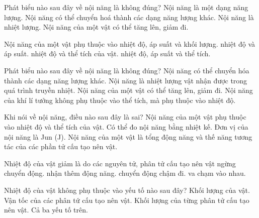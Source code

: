 \begin{ex}
Phát biểu nào sau đây về nội năng là không đúng?
\choice
{Nội năng là một dạng năng lượng.}
{Nội năng có thể chuyển hoá thành các dạng năng lượng khác.}
{\True Nội năng là nhiệt lượng.}
{Nội năng của một vật có thể tăng lên, giảm đi.}
\end{ex}

\begin{ex}
Nội năng của một vật phụ thuộc vào
\choice
{nhiệt độ, áp suất và khối lượng.}
{nhiệt độ và áp suất.}
{\True nhiệt độ và thể tích của vật.}
{nhiệt độ, áp suất và thể tích.}
\end{ex}

\begin{ex}
Phát biểu nào sau đây về nội năng là không đúng?
\choice
{Nội năng có thể chuyển hóa thành các dạng năng lượng khác.}
{\True Nội năng là nhiệt lượng vật nhận được trong quá trình truyền nhiệt.}
{Nội năng của một vật có thể tăng lên, giảm đi.}
{Nội năng của khí lí tưởng không phụ thuộc vào thể tích, mà phụ thuộc vào nhiệt độ.}
\end{ex}

\begin{ex}
Khi nói về nội năng, điều nào sau đây là sai?
\choice
{Nội năng của một vật phụ thuộc vào nhiệt độ và thể tích của vật.}
{\True Có thể đo nội năng bằng nhiệt kế.}
{Đơn vị của nội năng là Jun (J).}
{Nội năng của một vật là tổng động năng và thế năng tương tác của các phần tử cấu tạo nên vật.}
\end{ex}

\begin{ex}
Nhiệt độ của vật giảm là do các nguyên tử, phân tử cấu tạo nên vật
\choice
{ngừng chuyển động.}
{nhận thêm động năng.}
{\True chuyển động chậm đi.}
{va chạm vào nhau.}
\end{ex}

\begin{ex}
Nhiệt độ của vật không phụ thuộc vào yếu tố nào sau đây?
\choice
{\True Khối lượng của vật.}
{Vận tốc của các phân tứ cấu tạo nên vật.}
{Khối lượng của từng phân tử cấu tạo nên vật.}
{Cả ba yếu tố trên.}
\end{ex}

